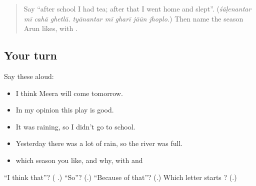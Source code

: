 \label{lesson:MR-R280-opinion-and-result}



\begin{quote}
Say \textquotedblleft{}after school I had tea; after that I went home and slept\textquotedblright{}. (\emph{śāḷenantar mī cahā ghetlā. tyānantar mī gharī jāūn jhoplo.}) Then name the season Arun likes, with \textbf{}.
\end{quote}

\subsection*{Your turn}
Say these aloud:

\begin{itemize}
\raggedright
  \item I think Meera will come tomorrow.
  \item In my opinion this play is good.
  \item It was raining, so I didn't go to school.
  \item Yesterday there was a lot of rain, so the river was full.
  \item which season you like, and why, with \textbf{} and \textbf{}
\end{itemize}

\begin{tcolorbox}[breakable,colback=teal!4,colframe=teal!35!black,title={Before you move on}]
\textquotedblleft{}I think that\textquotedblright{}? (\textbf{  }.) \textquotedblleft{}So\textquotedblright{}? (\textbf{}.) \textquotedblleft{}Because of that\textquotedblright{}? (\textbf{}.) Which letter starts \textbf{}? (\textbf{}.)
\end{tcolorbox}
